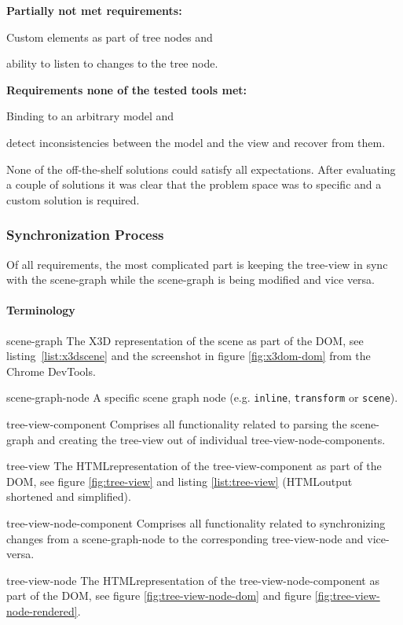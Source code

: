 \textbf{Partially not met requirements:}

\begin{itemize*}
  \item Custom elements as part of tree nodes and
  \item ability to listen to changes to the tree node.
\end{itemize*}

\textbf{Requirements none of the tested tools met:}

\begin{itemize*}
  \item Binding to an arbitrary model and
  \item detect inconsistencies between the model and the view and recover from them.
\end{itemize*}

None of the off-the-shelf solutions could satisfy all expectations. After
evaluating a couple of solutions it was clear that the problem space was to
specific and a custom solution is required.

\subsubsection{Synchronization Process}
\label{synchronization-process}

Of all requirements, the most complicated part is keeping the tree-view in sync
with the scene-graph while the scene-graph is being modified and vice
versa.

\paragraph{Terminology}
\label{terminology}

\begin{description*}
  \item[scene-graph]
    The X3D representation of the scene as part of the DOM, see listing~\ref{list:x3dscene} and the screenshot in figure \ref{fig:x3dom-dom} from the Chrome DevTools.
  \item[scene-graph-node]
    A specific scene graph node (e.g. \texttt{inline}, \texttt{transform} or \texttt{scene}).
  \item[tree-view-component]
    Comprises all functionality related to parsing the scene-graph and creating the tree-view out of individual tree-view-node-components.
  \item[tree-view]
    The \gls{HTML}representation of the tree-view-component as part of the DOM, see figure \ref{fig:tree-view} and listing \ref{list:tree-view} (\gls{HTML}output
    shortened and simplified).
  \item[tree-view-node-component]
    Comprises all functionality related to synchronizing changes from a scene-graph-node to the corresponding
    tree-view-node and vice-versa.
  \item[tree-view-node]
    The \gls{HTML}representation of the tree-view-node-component as part of the DOM, see figure \ref{fig:tree-view-node-dom} and figure \ref{fig:tree-view-node-rendered}.
\end{description*}


